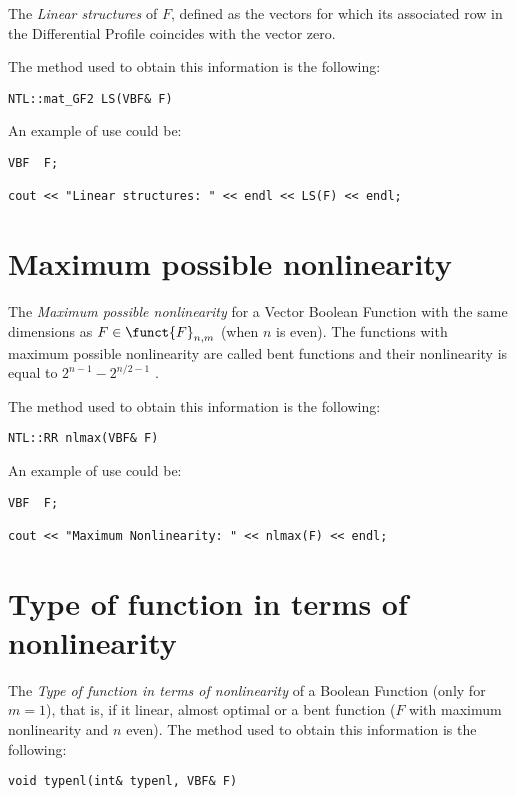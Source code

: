 The \textsl{Linear structures} of $F$, defined as the vectors for which
  its associated row in the Differential Profile coincides with the vector
  zero. 

The method used to obtain this information is the following:

\begin{verbatim}
NTL::mat_GF2 LS(VBF& F)
\end{verbatim}

An example of use could be:

\begin{verbatim}
VBF  F;

cout << "Linear structures: " << endl << LS(F) << endl;
\end{verbatim}

\section{Maximum possible nonlinearity}

The \textsl{Maximum possible nonlinearity} for a Vector Boolean Function
  with the same dimensions as $F \in \funct{F}_{n,m}$ (when $n$ is even). 
The functions with maximum possible nonlinearity are called bent functions and
  their nonlinearity is equal to $2^{n-1}-2^{n/2-1}$ \cite{Rothaus:76}.

The method used to obtain this information is the following:

\begin{verbatim}
NTL::RR nlmax(VBF& F)
\end{verbatim}

An example of use could be:

\begin{verbatim}
VBF  F;

cout << "Maximum Nonlinearity: " << nlmax(F) << endl;
\end{verbatim}

\section{Type of function in terms of nonlinearity}

The \textsl{Type of function in terms of nonlinearity} of a Boolean Function (only for $m=1$), that is, if it linear, almost optimal or a bent function ($F$ with maximum nonlinearity and $n$ even).  The method used to obtain this information is the following:

\begin{verbatim}
void typenl(int& typenl, VBF& F)
\end{verbatim}

